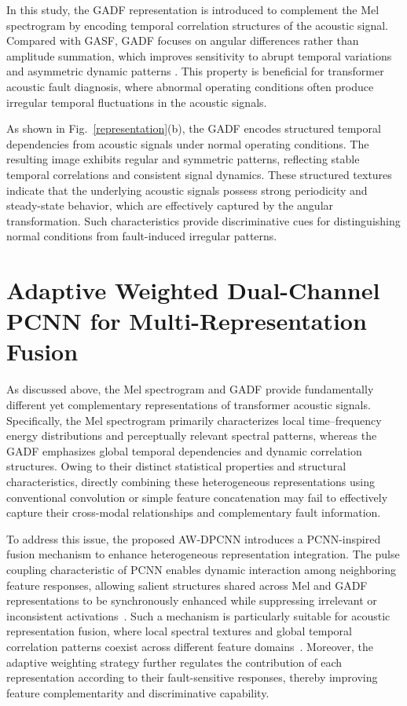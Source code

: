 \documentclass[anonymous]{iopjournal}
\begin{document}
In this study, the GADF representation is introduced to complement the Mel spectrogram by encoding temporal correlation structures of the acoustic signal. Compared with GASF, GADF focuses on angular differences rather than amplitude summation, which improves sensitivity to abrupt temporal variations and asymmetric dynamic patterns \cite{11278186}. This property is beneficial for transformer acoustic fault diagnosis, where abnormal operating conditions often produce irregular temporal fluctuations in the acoustic signals.

As shown in Fig.~\ref{representation}(b), the GADF encodes structured temporal dependencies from acoustic signals under normal operating conditions. The resulting image exhibits regular and symmetric patterns, reflecting stable temporal correlations and consistent signal dynamics. These structured textures indicate that the underlying acoustic signals possess strong periodicity and steady-state behavior, which are effectively captured by the angular transformation. Such characteristics provide discriminative cues for distinguishing normal conditions from fault-induced irregular patterns.

\section{Adaptive Weighted Dual-Channel PCNN for Multi-Representation Fusion}
\label{section3}
As discussed above, the Mel spectrogram and GADF provide fundamentally different yet complementary representations of transformer acoustic signals. Specifically, the Mel spectrogram primarily characterizes local time--frequency energy distributions and perceptually relevant spectral patterns, whereas the GADF emphasizes global temporal dependencies and dynamic correlation structures. Owing to their distinct statistical properties and structural characteristics, directly combining these heterogeneous representations using conventional convolution or simple feature concatenation may fail to effectively capture their cross-modal relationships and complementary fault information.

To address this issue, the proposed AW-DPCNN introduces a PCNN-inspired fusion mechanism to enhance heterogeneous representation integration. The pulse coupling characteristic of PCNN enables dynamic interaction among neighboring feature responses, allowing salient structures shared across Mel and GADF representations to be synchronously enhanced while suppressing irrelevant or inconsistent activations~\cite{Li_2018}. Such a mechanism is particularly suitable for acoustic representation fusion, where local spectral textures and global temporal correlation patterns coexist across different feature domains~\cite{kangEnhancementAlgorithmColor2021}. Moreover, the adaptive weighting strategy further regulates the contribution of each representation according to their fault-sensitive responses, thereby improving feature complementarity and discriminative capability.
\end{document}
